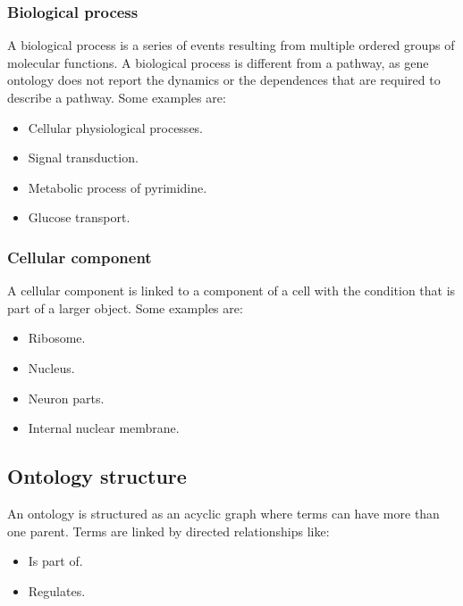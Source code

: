 		\subsubsection{Biological process}
		A biological process is a series of events resulting from multiple ordered groups of molecular functions.
		A biological process is different from a pathway, as gene ontology does not report the dynamics or the dependences that are required to describe a pathway.
		Some examples are:

		\begin{multicols}{4}
			\begin{itemize}
				\item Cellular physiological processes.
				\item Signal transduction.
				\item Metabolic process of pyrimidine.
				\item Glucose transport.
			\end{itemize}
		\end{multicols}

		\subsubsection{Cellular component}
		A cellular component is linked to a component of a cell with the condition that is part of a larger object.
		Some examples are:

		\begin{multicols}{4}
			\begin{itemize}
				\item Ribosome.
				\item Nucleus.
				\item Neuron parts.
				\item Internal nuclear membrane.
			\end{itemize}
		\end{multicols}

	\subsection{Ontology structure}
	An ontology is structured as an acyclic graph where terms can have more than one parent.
	Terms are linked by directed relationships like:

	\begin{multicols}{2}
		\begin{itemize}
			\item Is part of.
			\item Regulates.
		\end{itemize}
	\end{multicols}

